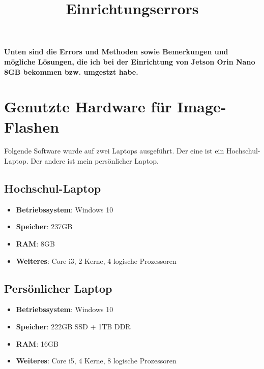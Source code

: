 \documentclass{article}
\title{Einrichtungserrors}
\author{}
\date{}
\begin{document}
\maketitle
\noindent\textbf{Unten sind die Errors und Methoden sowie Bemerkungen und mögliche Lösungen, die ich bei der Einrichtung von Jetson Orin Nano 8GB bekommen bzw. umgestzt habe.}
\section{Genutzte Hardware für Image-Flashen}

Folgende Software wurde auf zwei Laptops ausgeführt. Der eine ist ein Hochschul-Laptop. Der andere ist mein persönlicher Laptop. 

\subsection{Hochschul-Laptop}
\begin{itemize}
    \item \textbf{Betriebssystem}: Windows 10
    \item \textbf{Speicher}: 237GB
    \item \textbf{RAM}: 8GB
    \item \textbf{Weiteres}: Core i3, 2 Kerne, 4 logische Prozessoren
\end{itemize}

\subsection{Persönlicher Laptop}
\begin{itemize}
    \item \textbf{Betriebssystem}: Windows 10
    \item \textbf{Speicher}: 222GB SSD + 1TB DDR
    \item \textbf{RAM}: 16GB
    \item \textbf{Weiteres}: Core i5, 4 Kerne, 8 logische Prozessoren
\end{itemize}

\newpage
\end{document}
